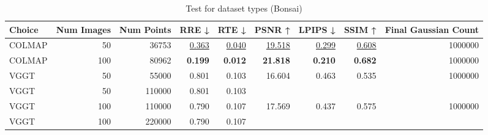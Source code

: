 \begin{table}[H]
\caption{Test for dataset types (Bonsai)}
\label{tab:99_dataset_type_bonsai}
\begin{tabular}{lrrrrrrrr}
\toprule
Choice & Num Images & Num Points & RRE ↓ & RTE ↓ & PSNR ↑ & LPIPS ↓ & SSIM ↑ & Final Gaussian Count \\
\midrule
COLMAP & 50 & 36753 & \underline{0.363} & \underline{0.040} & \underline{19.518} & \underline{0.299} & \underline{0.608} & 1000000 \\
COLMAP & 100 & 80962 & \textbf{0.199} & \textbf{0.012} & \textbf{21.818} & \textbf{0.210} & \textbf{0.682} & 1000000 \\
VGGT & 50 & 55000 & 0.801 & 0.103 & 16.604 & 0.463 & 0.535 & 1000000 \\
VGGT & 50 & 110000 & 0.801 & 0.103 &  &  &  &  \\
VGGT & 100 & 110000 & 0.790 & 0.107 & 17.569 & 0.437 & 0.575 & 1000000 \\
VGGT & 100 & 220000 & 0.790 & 0.107 &  &  &  &  \\
\bottomrule
\end{tabular}
\end{table}
